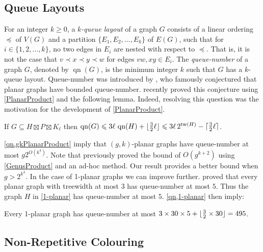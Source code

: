 \documentclass{patmorin}
\DeclareMathOperator{\tw}{tw}
\DeclareMathOperator{\qn}{qn}
\DeclarePairedDelimiter{\ceil}{\lceil}{\rceil}
\DeclarePairedDelimiter{\floor}{\lfloor}{\rfloor}
\renewcommand{\geq}{\geqslant}
\renewcommand{\leq}{\leqslant}
\begin{document}
\subsection{Queue Layouts}

For an integer $k\geq 0$, a \textit{$k$-queue layout} of a graph $G$ consists of a linear ordering $\preceq$ of $V(G)$ and a partition $\{E_1,E_2,\dots,E_k\}$ of $E(G)$, such that for $i\in\{1,2,\dots,k\}$, no two edges in $E_i$ are nested with respect to $\preceq$. That is, it is not the case that $v\prec x \prec y \prec w$ for edges $vw,xy\in E_i$. The \textit{queue-number} of a graph $G$, denoted by $\qn(G)$, is the minimum integer $k$ such that $G$ has a $k$-queue layout. Queue-number was introduced by \citet{HLR92}, who famously conjectured that planar graphs have bounded queue-number. \citet{dujmovic.joret.ea:planar} recently proved this conjecture using \cref{PlanarProduct} and the following lemma. Indeed, resolving this question was the motivation for the development of \cref{PlanarProduct}.

\begin{lem}
\label{qn}
If $G\subseteq H \boxtimes P \boxtimes K_\ell$ then 
$\qn(G) \leq  3 \ell \, \qn(H) + \floor{\tfrac{3}{2}\ell}
\leq 3 \ell \, 2^{\tw(H)}  - \ceil{\tfrac{3}{2}\ell}$. 
\end{lem}

\cref{qn,gkPlanarProduct} imply that $(g,k)$-planar graphs have queue-number at most $g 2^{O(k^4)}$.
Note that \citet{dujmovic.joret.ea:planar} previously proved the bound of
$O(g^{k+2})$ using \cref{GenusProduct} and an ad-hoc method. Our result provides a better bound when $g>2^{k^3}$. In the case of 1-planar graphs we can improve further. \citet{ABGKP18} proved that every planar graph with treewidth at most $3$ has queue-number at most $5$. Thus the graph $H$ in \cref{1-planar} has queue-number at most $5$. \cref{qn,1-planar} then imply:

\begin{cor}
Every 1-planar graph has queue-number at most $3 \times 30 \times 5 + \floor{\tfrac{3}{2} \times 30} = 495$. 
\end{cor}


\subsection{Non-Repetitive Colouring}
\end{document}
